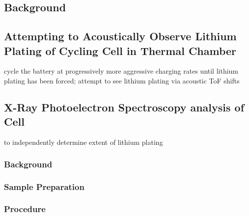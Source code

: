 \subsection{Background}

\subsection{Attempting to Acoustically Observe Lithium Plating of Cycling Cell in Thermal Chamber}
    cycle the battery at progressively more aggressive charging rates until lithium plating has been forced; attempt to see lithium plating via acoustic ToF shifts
    
\subsection{X-Ray Photoelectron Spectroscopy analysis of Cell}
    to independently determine extent of lithium plating
\subsubsection{Background}

\subsubsection{Sample Preparation}

\subsubsection{Procedure}
